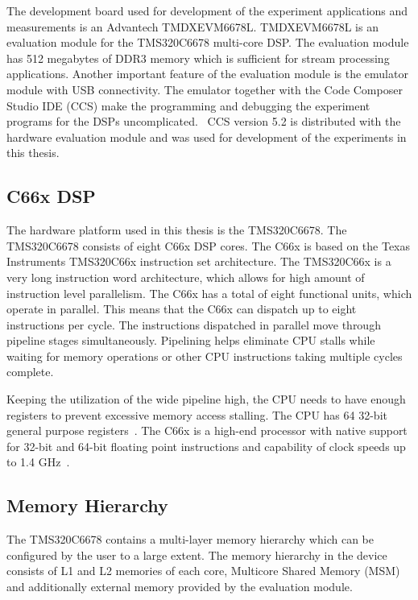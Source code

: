 The development board used for development of the experiment applications and measurements is an Advantech TMDXEVM6678L. TMDXEVM6678L is an evaluation module for the TMS320C6678 multi-core DSP. The evaluation module has 512 megabytes of DDR3 memory which is sufficient for stream processing applications. Another important feature of the evaluation module is the emulator module with USB connectivity. The emulator together with the Code Composer Studio IDE (CCS) make the programming and debugging the experiment programs for the DSPs uncomplicated.~\cite{evmref} CCS version 5.2 is distributed with the hardware evaluation module and was used for development of the experiments in this thesis.

\subsection{C66x DSP}
\label{subsec:c66x}
The hardware platform used in this thesis is the TMS320C6678. The TMS320C6678 consists of eight C66x DSP cores. The C66x is based on the Texas Instruments TMS320C66x instruction set architecture. The TMS320C66x is a very long instruction word architecture, which allows for high amount of instruction level parallelism. The C66x has a total of eight functional units, which operate in parallel. This means that the C66x can dispatch up to eight instructions per cycle. The instructions dispatched in parallel move through pipeline stages simultaneously. Pipelining helps eliminate CPU stalls while waiting for memory operations or other CPU instructions taking multiple cycles complete.~\cite{sprugh7}

Keeping the utilization of the wide pipeline high, the CPU needs to have enough registers to prevent excessive memory access stalling. The CPU has 64 32-bit general purpose registers~\cite{sprugh7}. The C66x is a high-end processor with native support for 32-bit and 64-bit floating point instructions and capability of clock speeds up to 1.4 GHz~\cite{sprugh7}.

\subsection{Memory Hierarchy}
\label{subsec:c66memory}


The TMS320C6678 contains a multi-layer memory hierarchy which can be configured by the user to a large extent. The memory hierarchy in the device consists of L1 and L2 memories of each core, Multicore Shared Memory (MSM) and additionally external memory provided by the evaluation module.

